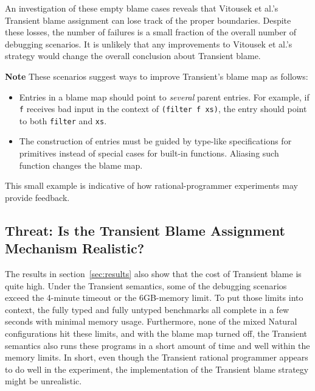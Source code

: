 An investigation of these empty blame cases reveals that Vitousek et al.'s
Transient blame assignment can lose track of the proper boundaries.  Despite
these losses, the number of failures is a small fraction of the overall number
of debugging scenarios. It is unlikely that any improvements to Vitousek et
al.'s strategy would change the overall conclusion about Transient blame.

{\bf Note} These scenarios suggest ways to improve Transient's blame map as
follows:
\begin{itemize}

\item Entries in a blame map should point to {\em several\/} parent entries.
 For example, if \texttt{f} receives bad input in the context of {\tt (filter f
 xs)}, the entry should point to both \texttt{filter} and \texttt{xs}.

\item The construction of entries must be guided by type-like specifications for
 primitives instead of special cases for built-in functions. Aliasing such
 function changes the blame map.



\end{itemize}
This small example is indicative of how rational-programmer experiments may
provide feedback. 


\subsection{Threat: Is the Transient Blame Assignment Mechanism Realistic?}
\label{sec:threat:transient2}

The results in section~\ref{sec:results} also show that the cost of Transient
blame is quite high. Under the Transient semantics, some of the debugging
scenarios exceed the 4-minute timeout or the 6GB-memory limit. To put those
limits into context, the fully typed and fully untyped benchmarks all complete
in a few seconds with minimal memory usage. Furthermore, none of the mixed
Natural configurations hit these limits, and with the blame map turned off,
the Transient semantics also runs these programs in a short amount of time and
well within the memory limits. In short, even though the Transient rational
programmer appears to do well in the experiment, the implementation of the
Transient blame strategy might be unrealistic. 

